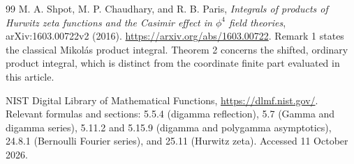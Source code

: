\documentclass[11pt,a4paper]{article}
\numberwithin{equation}{section}
\theoremstyle{definition}
\theoremstyle{remark}
\begin{document}
\begin{thebibliography}{99}
M. A. Shpot, M. P. Chaudhary, and R. B. Paris,
\emph{Integrals of products of Hurwitz zeta functions and the Casimir
effect in $\phi^4$ field theories},
arXiv:1603.00722v2 (2016).
\url{https://arxiv.org/abs/1603.00722}.
Remark 1 states the classical Mikol\'as product integral.  Theorem 2
concerns the shifted, ordinary product integral, which is distinct
from the coordinate finite part evaluated in this article.

NIST Digital Library of Mathematical Functions,
\url{https://dlmf.nist.gov/}.
Relevant formulas and sections: 5.5.4 (digamma reflection),
5.7 (Gamma and digamma series), 5.11.2 and 5.15.9
(digamma and polygamma asymptotics), 24.8.1
(Bernoulli Fourier series), and 25.11 (Hurwitz zeta).
Accessed 11 October 2026.

\end{thebibliography}

\end{document}
